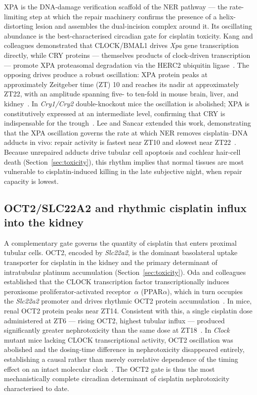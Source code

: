 \documentclass[preprint,review,12pt]{elsarticle}
\begin{document}
XPA is the DNA-damage verification scaffold of the NER pathway --- the
rate-limiting step at which the repair machinery confirms the presence of a
helix-distorting lesion and assembles the dual-incision complex around it.
Its oscillating abundance is the best-characterised circadian gate for
cisplatin toxicity.  Kang and colleagues demonstrated that CLOCK/BMAL1 drives
\emph{Xpa} gene transcription directly, while CRY proteins --- themselves
products of clock-driven transcription --- promote XPA proteasomal degradation
via the HERC2 ubiquitin ligase~\cite{Kang2010}.  The opposing drives produce
a robust oscillation: XPA protein peaks at approximately Zeitgeber time (ZT)
10 and reaches its nadir at approximately ZT22, with an amplitude spanning
five- to ten-fold in mouse brain, liver, and kidney~\cite{Kang2010}.
In \emph{Cry1/Cry2} double-knockout mice the oscillation is abolished; XPA
is constitutively expressed at an intermediate level, confirming that CRY is
indispensable for the trough~\cite{Kang2010}.  Lee and Sancar extended this
work, demonstrating that the XPA oscillation governs the rate at which NER
removes cisplatin--DNA adducts in vivo: repair activity is fastest near ZT10
and slowest near ZT22~\cite{Lee2011a, Lee2011b}.  Because unrepaired adducts
drive tubular cell apoptosis and cochlear hair-cell death (Section~\ref{sec:toxicity}),
this rhythm implies that normal tissues are most vulnerable to cisplatin-induced
killing in the late subjective night, when repair capacity is lowest.

\subsection{OCT2/SLC22A2 and rhythmic cisplatin influx into the kidney}

A complementary gate governs the quantity of cisplatin that enters proximal
tubular cells.  OCT2, encoded by \emph{Slc22a2}, is the dominant basolateral
uptake transporter for cisplatin in the kidney and the primary determinant of
intratubular platinum accumulation (Section~\ref{sec:toxicity}).
Oda and colleagues established that the CLOCK transcription factor
transcriptionally induces peroxisome proliferator-activated receptor~$\alpha$
(PPAR$\alpha$), which in turn occupies the \emph{Slc22a2} promoter and drives
rhythmic OCT2 protein accumulation~\cite{Oda2014}.  In mice, renal OCT2
protein peaks near ZT14.  Consistent with this, a single cisplatin dose
administered at ZT6 --- rising OCT2, highest tubular influx --- produced
significantly greater nephrotoxicity than the same dose at ZT18~\cite{Oda2014}.
In \emph{Clock} mutant mice lacking CLOCK transcriptional activity, OCT2
oscillation was abolished and the dosing-time difference in nephrotoxicity
disappeared entirely, establishing a causal rather than merely correlative
dependence of the timing effect on an intact molecular clock~\cite{Oda2014}.
The OCT2 gate is thus the most mechanistically complete circadian determinant
of cisplatin nephrotoxicity characterised to date.
\end{document}
